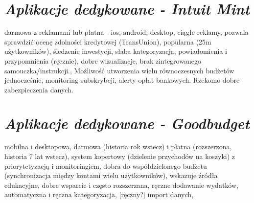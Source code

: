 \documentclass[a4paper,10pt, twoside]{report}
\newcommand{\customstylesection}[1]{\textbf{\textit{#1}}}
\begin{document}
\section{\customstylesection{Aplikacje dedykowane - Intuit Mint}}
{darmowa z reklamami lub płatna - ios, android, desktop, ciągłe reklamy, pozwala
 sprawdzić ocenę zdolności kredytowej (TransUnion), popularna 
(25m użytkowników), śledzenie inwestycji, słaba kategoryzacja, powiadomienia i 
przypomnienia (ręcznie), dobre wizualizacje, brak zintegrowanego 
samouczka/instrukcji., Możliwość utworzenia wielu równoczesnych budżetów 
jednocześnie, monitoring subskrybcji, alerty opłat bankowych. Rzekomo dobre 
zabezpieczenia danych.}

\section{\customstylesection{Aplikacje dedykowane - Goodbudget}}
{mobilna i desktopowa, darmowa (historia rok wstecz) i płatna 
(rozszerzona, historia 7 lat wstecz), system kopertowy (dzielenie przychodów na 
koszyki) z priorytetyzacją i monitoringiem, dobra do współdzielonego budżetu 
(synchronizacja między kontami wielu użytkowników), wskazuje źródła edukacyjne, 
dobre wsparcie i często rozszerzana, ręczne dodawanie wydatków, automatyczna i 
ręczna kategoryzacja, [ręczny?] import danych,}

\end{document}
